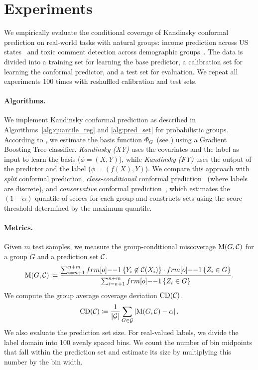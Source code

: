 \section{Experiments}
We empirically evaluate the conditional coverage of Kandinsky conformal prediction on real-world tasks with natural groups: income prediction across US states~\citep{DingHMS21} and toxic comment detection across demographic groups~\citep{BDSTV19,Koh21}. The data is divided into a training set for learning the base predictor, a calibration set for learning the conformal predictor, and a test set for evaluation. We repeat all experiments 100 times with reshuffled calibration and test sets.
\paragraph{Algorithms.}  We implement Kandinsky conformal prediction as described in Algorithms~\ref{alg:quantile_reg} and \ref{alg:pred_set} for probabilistic groups. According to , we estimate the basis function $\Phi_G$~(see ) using a Gradient Boosting Tree classifier. \emph{Kandinsky (XY)} uses the covariates and the label as input to learn the basis ($\phi=(X,Y)$), while \emph{Kandinsky (FY)} uses the output of the predictor and the label ($\phi=(f(X),Y)$). We compare this approach with \emph{split} conformal prediction, \emph{class-conditional} conformal prediction~\citep{LBLJ15} (where labels are discrete), and \emph{conservative} conformal prediction~\citep{BCRT21}, which estimates the $(1-\alpha)$-quantile of scores for each group and constructs sets using the score threshold determined by the maximum quantile. 
\paragraph{Metrics.} Given $m$ test samples, we measure the group-conditional miscoverage $\operatorname{M}(G, {\cal C})$ for a group $G$ and a prediction set ${\cal C}$.
\begin{align*}
\operatorname{M}(G,\calC) \coloneqq \frac{\sum_{i=n+1}^{n+m} \11\sth{Y_{i} \not\in\calC(X_i)}\cdot\11\sth{Z_i\in G}}{\sum_{i=n+1}^{n+m} \11\sth{Z_i\in G}}.
\end{align*}
We compute the group average coverage deviation $\operatorname{CD}({\cal C})$.
\begin{align*}
    \operatorname{CD}({\cal C}) \coloneqq \frac{1}{|{\cal G}|}\sum_{G\in{\cal G}} \left|\operatorname{M}(G,{\cal C}) - \alpha\right|.
\end{align*}
We also evaluate the prediction set size. For real-valued labels, we divide the label domain into 100 evenly spaced bins. We count the number of bin midpoints that fall within the prediction set and estimate its size by multiplying this number by the bin width.

